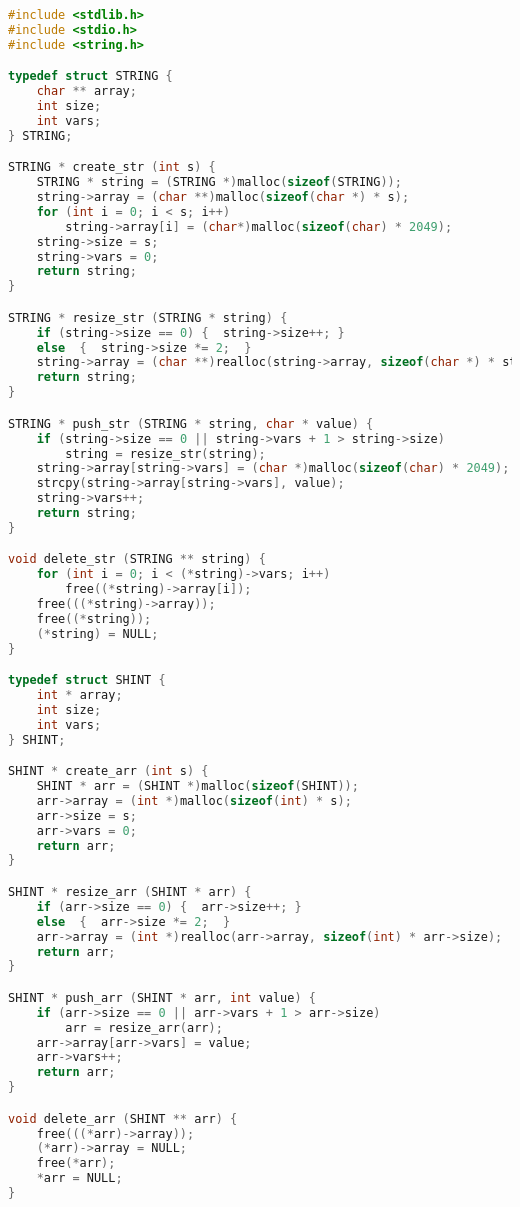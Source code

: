 \begin{lstlisting}[language=C]
#include <stdlib.h>
#include <stdio.h>
#include <string.h>

typedef struct STRING { 
    char ** array;
    int size;
    int vars;
} STRING;

STRING * create_str (int s) { 
    STRING * string = (STRING *)malloc(sizeof(STRING));
    string->array = (char **)malloc(sizeof(char *) * s); 
    for (int i = 0; i < s; i++)
        string->array[i] = (char*)malloc(sizeof(char) * 2049); 
    string->size = s; 
    string->vars = 0;
    return string;
}

STRING * resize_str (STRING * string) { 
    if (string->size == 0) {  string->size++; } 
    else  {  string->size *= 2;  } 
    string->array = (char **)realloc(string->array, sizeof(char *) * string->size); 
    return string;
}

STRING * push_str (STRING * string, char * value) { 
    if (string->size == 0 || string->vars + 1 > string->size)
        string = resize_str(string); 
    string->array[string->vars] = (char *)malloc(sizeof(char) * 2049); 
    strcpy(string->array[string->vars], value); 
    string->vars++; 
    return string;
}

void delete_str (STRING ** string) { 
    for (int i = 0; i < (*string)->vars; i++)
        free((*string)->array[i]); 
    free(((*string)->array)); 
    free((*string)); 
    (*string) = NULL;
}

typedef struct SHINT {
    int * array;
    int size;
    int vars;
} SHINT;

SHINT * create_arr (int s) {
    SHINT * arr = (SHINT *)malloc(sizeof(SHINT));
    arr->array = (int *)malloc(sizeof(int) * s);
    arr->size = s;
    arr->vars = 0;
    return arr;
}

SHINT * resize_arr (SHINT * arr) { 
    if (arr->size == 0) {  arr->size++; } 
    else  {  arr->size *= 2;  } 
    arr->array = (int *)realloc(arr->array, sizeof(int) * arr->size); 
    return arr;
}

SHINT * push_arr (SHINT * arr, int value) { 
    if (arr->size == 0 || arr->vars + 1 > arr->size)
        arr = resize_arr(arr); 
    arr->array[arr->vars] = value; 
    arr->vars++; 
    return arr;
}

void delete_arr (SHINT ** arr) { 
    free(((*arr)->array)); 
    (*arr)->array = NULL; 
    free(*arr); 
    *arr = NULL; 
}


\end{lstlisting}
